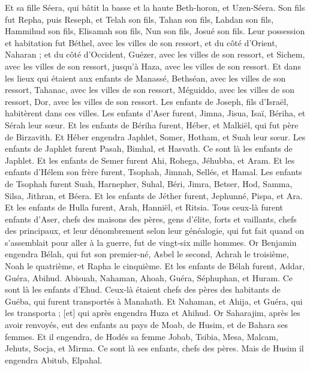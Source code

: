 \begin{multicols}{2}
Et sa fille Séera, qui bâtit la basse et la haute Beth-horon, et Uzen-Séera.
Son fils fut Repha, puis Reseph, et Telah son fils, Tahan son fils,
Lahdan son fils, Hammihud son fils, Elisamah son fils,
Nun son fils, Josué son fils.
Leur possession et habitation fut Béthel, avec les villes de son ressort, et du côté d'Orient, Naharan ; et du côté d'Occident, Guézer, avec les villes de son ressort, et Sichem, avec les villes de son ressort, jusqu'à Haza, avec les villes de son ressort.
Et dans les lieux qui étaient aux enfants de Manassé, Bethséan, avec les villes de son ressort, Tahanac, avec les villes de son ressort, Méguiddo, avec les villes de son ressort, Dor, avec les villes de son ressort. Les enfants de Joseph, fils d'Israël, habitèrent dans ces villes.
Les enfants d'Aser furent, Jimna, Jisua, Isaï, Bériha, et Sérah leur sœur.
Et les enfants de Bériha furent, Héber, et Malkiël, qui fut père de Birzavith.
Et Héber engendra Japhlet, Somer, Hotham, et Suah leur sœur.
Les enfants de Japhlet furent Pasah, Bimhal, et Hasvath. Ce sont là les enfants de Japhlet.
Et les enfants de Semer furent Ahi, Rohega, Jéhubba, et Aram.
Et les enfants d'Hélem son frère furent, Tsophah, Jimnah, Sellés, et Hamal.
Les enfants de Tsophah furent Suah, Harnepher, Suhal, Béri, Jimra,
Betser, Hod, Samma, Silsa, Jithran, et Béera.
Et les enfants de Jéther furent, Jephunné, Pispa, et Ara.
Et les enfants de Hulla furent, Arah, Hanniël, et Ritsia.
Tous ceux-là furent enfants d'Aser, chefs des maisons des pères, gens d'élite, forts et vaillants, chefs des principaux, et leur dénombrement selon leur généalogie, qui fut fait quand on s'assemblait pour aller à la guerre, fut de vingt-six mille hommes.
\VerseOne{}Or Benjamin engendra Bélah, qui fut son premier-né, Asbel le second, Achrah le troisième,
Noah le quatrième, et Rapha le cinquième.
Et les enfants de Bélah furent, Addar, Guéra, Abihud.
Abisuah, Nahaman, Ahoah,
Guéra, Séphuphan, et Huram.
Ce sont là les enfants d'Ehud. Ceux-là étaient chefs des pères des habitants de Guéba, qui furent transportés à Manahath.
Et Nahaman, et Ahija, et Guéra, qui les transporta ; [et] qui après engendra Huza et Ahihud.
Or Saharajim, après les avoir renvoyés, eut des enfants au pays de Moab, de Husim, et de Bahara ses femmes.
Et il engendra, de Hodés sa femme Jobab, Tsibia, Mesa, Malcam,
Jehuts, Socja, et Mirma. Ce sont là ses enfants, chefs des pères.
Mais de Husim il engendra Abitub, Elpahal.

\end{multicols}

